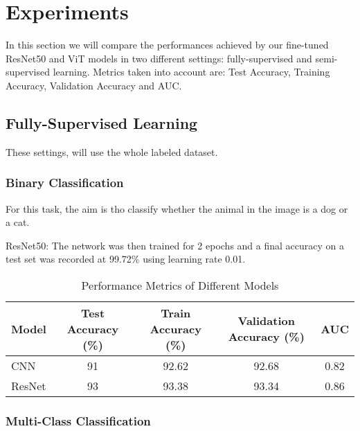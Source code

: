 \documentclass{article}
\begin{document}
\section{Experiments}
In this section we will compare the performances achieved by our fine-tuned ResNet50 and ViT models in two different settings: fully-supervised and semi-supervised learning. Metrics taken into account are: Test Accuracy, Training Accuracy, Validation Accuracy and AUC.

\subsection{Fully-Supervised Learning}
These settings, will use the whole labeled dataset.

\subsubsection{Binary Classification}
For this task, the aim is tho classify whether the animal in the image is a dog or a cat.

ResNet50:  The network was then trained for 2 epochs and a final accuracy on a test set was recorded at 99.72\% using learning rate 0.01. 

\renewcommand{\arraystretch}{1.2} 
\begin{table}[h!] %
    \centering %
    \caption{Performance Metrics of Different Models} %
    \label{tab:fully_binary_perf} %
    \begin{tabular}{|l|c|c|c|c|}
        \hline
        Model & Test Accuracy (\%) & Train Accuracy (\%) & Validation Accuracy (\%) & AUC \\
        \hline
        CNN & 91 & 92.62 & 92.68 & 0.82 \\
        ResNet & 93 & 93.38 & 93.34 & 0.86 \\
        \hline
    \end{tabular}
\end{table}

\subsubsection{Multi-Class Classification}
\end{document}
